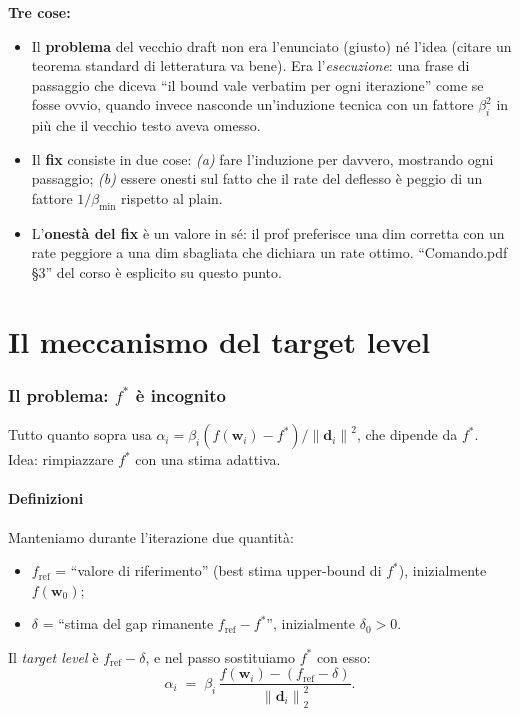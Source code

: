 \documentclass[11pt,a4paper]{article}
\newcommand{\norm}[1]{\left\|#1\right\|}
\newcommand{\bw}{\mathbf{w}}
\newcommand{\bd}{\mathbf{d}}
\theoremstyle{definition}
\begin{document}
\begin{tcolorbox}[intuition]
\textbf{Tre cose:}
\begin{itemize}[leftmargin=*]
\item Il \textbf{problema} del vecchio draft non era l'enunciato (giusto) né l'idea (citare un teorema standard di letteratura va bene). Era l'\emph{esecuzione}: una frase di passaggio che diceva ``il bound vale verbatim per ogni iterazione'' come se fosse ovvio, quando invece nasconde un'induzione tecnica con un fattore $\beta_i^2$ in più che il vecchio testo aveva omesso.
\item Il \textbf{fix} consiste in due cose: \emph{(a)} fare l'induzione per davvero, mostrando ogni passaggio; \emph{(b)} essere onesti sul fatto che il rate del deflesso è peggio di un fattore $1/\beta_{\min}$ rispetto al plain.
\item L'\textbf{onestà del fix} è un valore in sé: il prof preferisce una dim corretta con un rate peggiore a una dim sbagliata che dichiara un rate ottimo. ``Comando.pdf §3'' del corso è esplicito su questo punto.
\end{itemize}
\end{tcolorbox}

\part{Il meccanismo del target level}

\section{Il problema: $f^*$ è incognito}
\label{sec:target-level}

Tutto quanto sopra usa $\alpha_i = \beta_i(f(\bw_i)-f^*)/\norm{\bd_i}^2$, che dipende da $f^*$. Idea: rimpiazzare $f^*$ con una stima adattiva.

\subsection{Definizioni}

Manteniamo durante l'iterazione due quantità:
\begin{itemize}[leftmargin=*]
\item $f_{\mathrm{ref}}$ = ``valore di riferimento'' (best stima upper-bound di $f^*$), inizialmente $f(\bw_0)$;
\item $\delta$ = ``stima del gap rimanente $f_{\mathrm{ref}}-f^*$'', inizialmente $\delta_0>0$.
\end{itemize}
Il \emph{target level} è $f_{\mathrm{ref}} - \delta$, e nel passo sostituiamo $f^*$ con esso:
\begin{equation}
\label{eq:tl-step}
\alpha_i \;=\; \beta_i\,\frac{f(\bw_i) - (f_{\mathrm{ref}}-\delta)}{\norm{\bd_i}_2^2}.
\end{equation}
\end{document}
